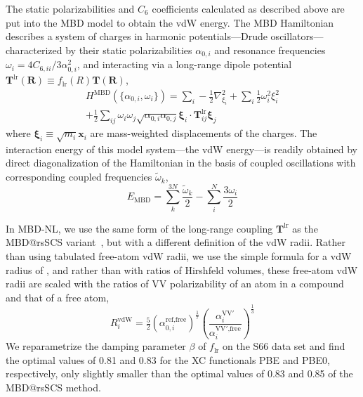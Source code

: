 The static polarizabilities and $C_6$ coefficients calculated as described above are put into the MBD model to obtain the vdW energy.
The MBD Hamiltonian describes a system of charges in harmonic potentials---Drude oscillators---characterized by their static polarizabilities $\alpha_{0,i}$ and resonance frequencies $\omega_i=4C_{6,ii}/3\alpha_{0,i}^2$, and interacting via a long-range dipole potential $\mathbf T^\mathrm{lr}(\mathbf R)\equiv f_\text{lr}(R)\mathbf T(\mathbf R)$,
\begin{multline}
  H^\text{MBD}(\{\alpha_{0,i},\omega_i\})=\sum_i-\frac12\nabla_{\xi_i}^2+\sum_i\frac12\omega_i^2\xi_i^2 \\
  +\frac12\sum_{ij}\omega_i\omega_j\sqrt{\alpha_{0,i}\alpha_{0,j}}\boldsymbol{\xi}_i\cdot\mathbf T^\mathrm{lr}_{ij}\boldsymbol{\xi}_j
\end{multline}
where $\boldsymbol\xi_i\equiv\sqrt{m_i}\mathbf x_i$ are mass-weighted displacements of the charges.
The interaction energy of this model system---the vdW energy---is readily obtained by direct diagonalization of the Hamiltonian in the basis of coupled oscillations with corresponding coupled frequencies $\tilde\omega_k$,
\begin{equation}
  E_\text{MBD}=\sum_k^{3N}\frac{\tilde\omega_k}2-\sum_i^N\frac{3\omega_i}2
\end{equation}

In MBD-NL, we use the same form of the long-range coupling $\mathbf T^\text{lr}$ as the MBD@rsSCS variant~\citep{AmbrosettiJCP14}, but with a different definition of the vdW radii.
Rather than using tabulated free-atom vdW radii, we use the simple formula for a vdW radius of \citet{FedorovPRL18}, and rather than with ratios of Hirshfeld volumes, these free-atom vdW radii are scaled with the ratios of VV polarizability of an atom in a compound and that of a free atom,\begin{equation}
  R_i^\text{vdW}=\tfrac52{(\alpha_{0,i}^\text{ref,free})}^\frac17{\left(\frac{\alpha_i^\mathrm{VV'}}{\alpha_i^\text{VV$'$,free}}\right)}^\frac13
\end{equation}
We reparametrize the damping parameter $\beta$ of $f_\text{lr}$ on the S66 data set and find the optimal values of 0.81 and 0.83 for the XC functionals PBE and PBE0, respectively, only slightly smaller than the optimal values of 0.83 and 0.85 of the MBD@rsSCS method.



